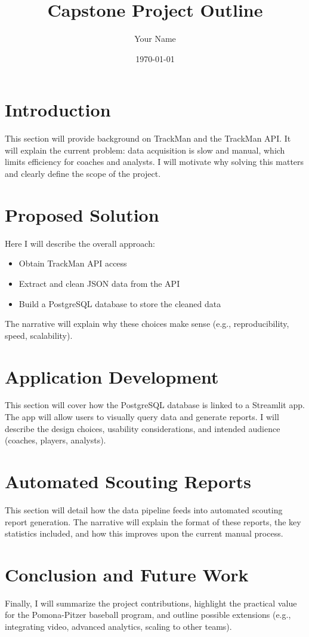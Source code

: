 \documentclass[12pt]{article}
\title{Capstone Project Outline}
\author{Your Name}
\date{\today}
\begin{document}
\maketitle

\section*{Introduction}
This section will provide background on TrackMan and the TrackMan API. 
It will explain the current problem: data acquisition is slow and manual, which limits efficiency for coaches and analysts. 
I will motivate why solving this matters and clearly define the scope of the project.  

\section*{Proposed Solution}
Here I will describe the overall approach:  
\begin{itemize}
    \item Obtain TrackMan API access  
    \item Extract and clean JSON data from the API  
    \item Build a PostgreSQL database to store the cleaned data  
\end{itemize}
The narrative will explain why these choices make sense (e.g., reproducibility, speed, scalability).  

\section*{Application Development}
This section will cover how the PostgreSQL database is linked to a Streamlit app.  
The app will allow users to visually query data and generate reports.  
I will describe the design choices, usability considerations, and intended audience (coaches, players, analysts).  

\section*{Automated Scouting Reports}
This section will detail how the data pipeline feeds into automated scouting report generation.  
The narrative will explain the format of these reports, the key statistics included, and how this improves upon the current manual process.  

\section*{Conclusion and Future Work}
Finally, I will summarize the project contributions, highlight the practical value for the Pomona-Pitzer baseball program, 
and outline possible extensions (e.g., integrating video, advanced analytics, scaling to other teams).  
\end{document}
